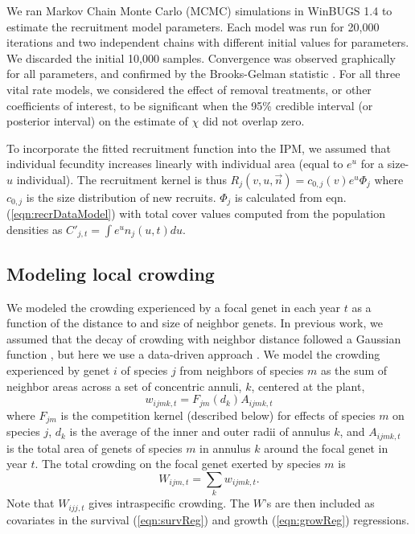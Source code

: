 \documentclass[11pt]{article}
\begin{document}
We ran Markov Chain Monte Carlo (MCMC) simulations in WinBUGS 1.4 \citep{lunn_winbugs_2000} to estimate the recruitment model parameters. Each model was run for 20,000 iterations and two independent chains with different initial values for parameters. We discarded the initial 10,000 samples. Convergence was observed graphically for all parameters, and confirmed by the Brooks-Gelman statistic \citep{brooks_general_1998}. For all three vital rate models, we considered the effect of removal treatments, or other coefficients of interest, to be significant when the 95\% credible interval (or posterior interval) on the estimate of $\chi$ did not overlap zero.  

To incorporate the fitted recruitment function into the IPM, we assumed that individual fecundity increases 
linearly with individual area (equal to $e^u$ for a size-$u$ individual). The recruitment kernel is thus
$R_j(v,u,\vec{n})=c_{0,j}(v)e^{u}\Phi_j$ \citep{adler_coexistence_2010} where $c_{0,j}$ is the
size distribution of new recruits. $\Phi_j$ is calculated from eqn. (\ref{eqn:recrDataModel}) with total cover values computed from the population densities as $C'_{j,t} = \int e^u n_j(u,t) du$. 

\subsection{Modeling local crowding}
We modeled the crowding experienced by a focal genet in each year $t$ as a function of the distance to and size of neighbor genets. In previous work, 
we assumed that the decay of crowding with neighbor distance followed a Gaussian function \citep{chu_large_2015}, but here we use a data-driven 
approach \citep{teller_linking_2016}. We model the crowding experienced by genet $i$ of species $j$ from neighbors of species $m$ as the sum of neighbor 
areas across a set of concentric annuli, $k$, centered at the plant,
\begin{equation}
w_{ijmk,t} = F_{jm}(d_{k})A_{ijmk,t}     
\label{eqn:wik}
\end{equation}
where $F_{jm}$ is the competition kernel (described below) for effects of species $m$ on species $j$, 
$d_{k}$ is the average of the inner and outer radii of annulus $k$, 
and $A_{ijmk,t}$ is the total area of genets of species $m$ in annulus $k$ around the focal genet in year $t$. The total crowding on 
the focal genet exerted by species $m$ is
\begin{equation}
W_{ijm,t}  =\sum_k {w_{ijmk,t}} .
\label{eqn:wijm}
\end{equation} 
Note that $W_{ijj,t}$ gives intraspecific crowding. The $W$'s are then 
included as covariates in the survival (\ref{eqn:survReg}) and growth (\ref{eqn:growReg}) regressions.
\end{document}

